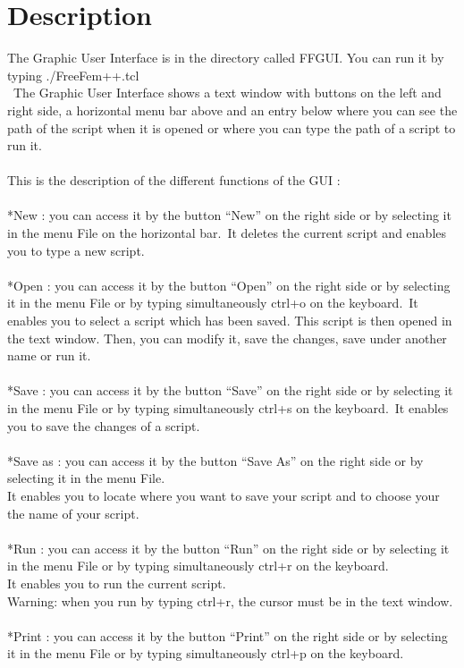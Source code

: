 \documentclass[a4paper]{report}
\begin{document}
\section{Description}
\huge
The Graphic User Interface is in the directory called FFGUI.
You can run it by typing ./FreeFem++.tcl\\
\
The Graphic User Interface shows a text window with buttons on the left and right side, a horizontal menu bar above and an entry below where you can see the path of the script when it is opened or where you can type the path of a script to run it.\\
\\
This is the description of the different functions of the GUI :\\
\\
*New : you can access it by the button ``New'' on the right side or by selecting it in the menu File on the horizontal bar.\
It deletes the current script and enables you to type a new script.\\
\\
*Open : you can access it by the button ``Open'' on the right side or by selecting it in the menu File or by typing simultaneously ctrl+o on the keyboard.\
It enables you to select a script which has been saved. This script is then opened in the text window. Then, you can modify it, save the changes, save under another name or run it.\\
\\
*Save : you can access it by the button ``Save'' on the right side or by selecting it in the menu File or by typing simultaneously ctrl+s on the keyboard.\
It enables you to save the changes of a script.\\
\\
*Save as : you can access it by the button ``Save As'' on the right side or by selecting it in the menu File.\\
It enables you to locate where you want to save your script and to choose your the name of your script.\\
\\
*Run : you can access it by the button ``Run'' on the right side or by selecting it in the menu File or by typing simultaneously ctrl+r on the keyboard.\\
It enables you to run the current script.\\
Warning: when you run by typing ctrl+r, the cursor must be in the text window.\\
\\
*Print : you can access it by the button ``Print'' on the right side or by selecting it in the menu File or by typing simultaneously ctrl+p on the keyboard.\\
\end{document}
